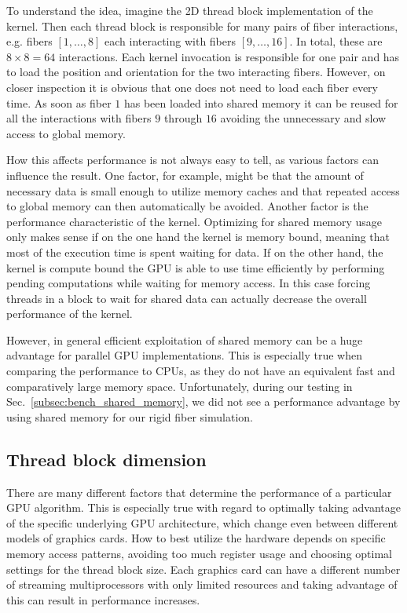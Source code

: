 To understand the idea, imagine the 2D thread block implementation of the kernel. Then each thread block is responsible for many pairs of fiber interactions, e.g. fibers $[1,\dots,8]$ each interacting with fibers $[9,\dots,16]$. In total, these are $8 \times 8 = 64$ interactions. Each kernel invocation is responsible for one pair and has to load the position and orientation for the two interacting fibers. However, on closer inspection it is obvious that one does not need to load each fiber every time. As soon as fiber $1$ has been loaded into shared memory it can be reused for all the interactions with fibers $9$ through $16$ avoiding the unnecessary and slow access to global memory.

How this affects performance is not always easy to tell, as various factors can influence the result. One factor, for example, might be that the amount of necessary data is small enough to utilize memory caches and that repeated access to global memory can then automatically be avoided. Another factor is the performance characteristic of the kernel. Optimizing for shared memory usage only makes sense if on the one hand the kernel is memory bound, meaning that most of the execution time is spent waiting for data. If on the other hand, the kernel is compute bound the GPU is able to use time efficiently by performing pending computations while waiting for memory access. In this case forcing threads in a block to wait for shared data can actually decrease the overall performance of the kernel.

However, in general efficient exploitation of shared memory can be a huge advantage for parallel GPU implementations. This is especially true when comparing the performance to CPUs, as they do not have an equivalent fast and comparatively large memory space. Unfortunately, during our testing in Sec.~\ref{subsec:bench_shared_memory}, we did not see a performance advantage by using shared memory for our rigid fiber simulation.

\subsection{Thread block dimension}
\label{subsec:bench_thread_block}

There are many different factors that determine the performance of a particular GPU algorithm. This is especially true with regard to optimally taking advantage of the specific underlying GPU architecture, which change even between different models of graphics cards. How to best utilize the hardware depends on specific memory access patterns, avoiding too much register usage and choosing optimal settings for the thread block size. Each graphics card can have a different number of streaming multiprocessors with only limited resources and taking advantage of this can result in performance increases.

